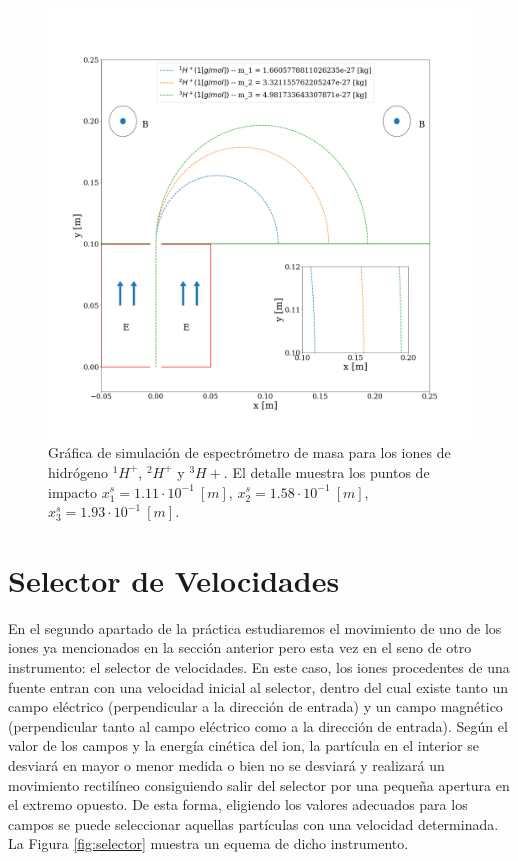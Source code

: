 \documentclass[journal]{IEEEtran}
\begin{document}
\begin{figure}[!htb]
    \includegraphics[width=\linewidth]{espectrometro_simulacion}
    \caption{Gráfica de simulación de espectrómetro de masa para los iones de hidrógeno $^1H^+$, $^2H^+$ y $^3H+$. El detalle muestra los puntos de impacto $x^s_1 = 1.11\cdot 10^{-1}~[m]$, $x^s_2 = 1.58\cdot 10^{-1}~[m]$, $x^s_3 = 1.93\cdot 10^{-1}~[m]$.}
    \label{fig:espectrometro_simulacion}
\end{figure}

\clearpage

\section{Selector de Velocidades}
\label{sec:selector}

En el segundo apartado de la práctica estudiaremos el movimiento de uno de los iones ya mencionados en la sección anterior pero esta vez en el seno de otro instrumento: el selector de velocidades. En este caso, los iones procedentes de una fuente entran con una velocidad inicial al selector, dentro del cual existe tanto un campo eléctrico (perpendicular a la dirección de entrada) y un campo magnético (perpendicular tanto al campo eléctrico como a la dirección de entrada). Según el valor de los campos y la energía cinética del ion, la partícula en el interior se desviará en mayor o menor medida o bien no se desviará y realizará un movimiento rectilíneo consiguiendo salir del selector por una pequeña apertura en el extremo opuesto. De esta forma, eligiendo los valores adecuados para los campos se puede seleccionar aquellas partículas con una velocidad determinada. La Figura \ref{fig:selector} muestra un equema de dicho instrumento.
\end{document}
